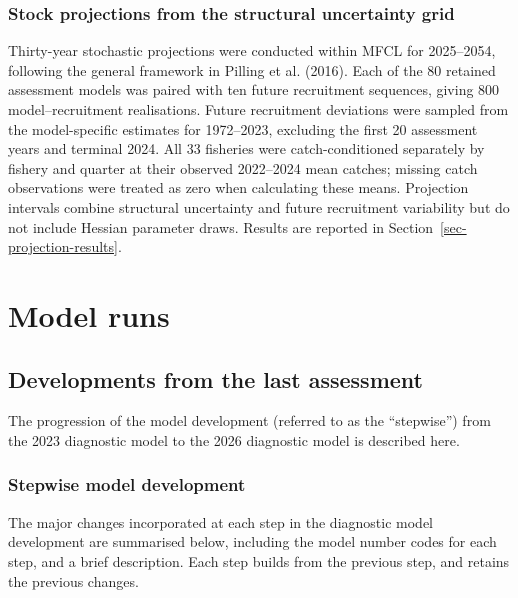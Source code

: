 \documentclass[
  english,
  a4paper,
  a4paper,
  11pt]{SCreport}
\begin{document}
\subsubsection{Stock projections from the structural uncertainty
grid}\label{sec-method-projections}

Thirty-year stochastic projections were conducted within MFCL for
2025--2054, following the general framework in Pilling et al. (2016).
Each of the 80 retained assessment models was paired with ten future
recruitment sequences, giving 800 model--recruitment realisations.
Future recruitment deviations were sampled from the model-specific
estimates for 1972--2023, excluding the first 20 assessment years and
terminal 2024. All 33 fisheries were catch-conditioned separately by
fishery and quarter at their observed 2022--2024 mean catches; missing
catch observations were treated as zero when calculating these means.
Projection intervals combine structural uncertainty and future
recruitment variability but do not include Hessian parameter draws.
Results are reported in Section~\ref{sec-projection-results}.

\section{Model runs}\label{model-runs}

\subsection{Developments from the last assessment}\label{sec-stepwise}

The progression of the model development (referred to as the
``stepwise'') from the 2023 diagnostic model to the 2026 diagnostic
model is described here.

\subsubsection{Stepwise model
development}\label{stepwise-model-development}

The major changes incorporated at each step in the diagnostic model
development are summarised below, including the model number codes for
each step, and a brief description. Each step builds from the previous
step, and retains the previous changes.
\end{document}
